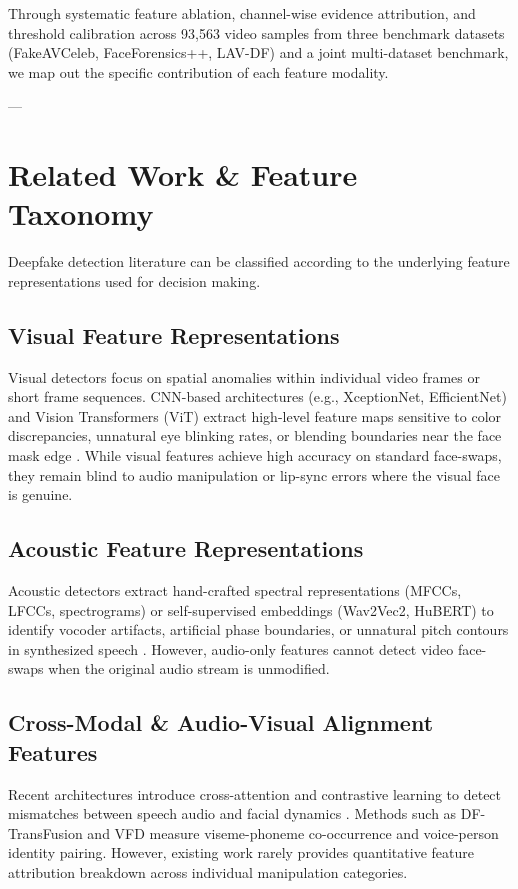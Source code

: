\documentclass[conference]{IEEEtran}
\begin{document}
Through systematic feature ablation, channel-wise evidence attribution, and threshold calibration across 93,563 video samples from three benchmark datasets (FakeAVCeleb, FaceForensics++, LAV-DF) and a joint multi-dataset benchmark, we map out the specific contribution of each feature modality.

---

\section{Related Work \& Feature Taxonomy}

Deepfake detection literature can be classified according to the underlying feature representations used for decision making.

\subsection{Visual Feature Representations}
Visual detectors focus on spatial anomalies within individual video frames or short frame sequences. CNN-based architectures (e.g., XceptionNet, EfficientNet) and Vision Transformers (ViT) extract high-level feature maps sensitive to color discrepancies, unnatural eye blinking rates, or blending boundaries near the face mask edge \cite{rossler2019faceforensics, zhao2024interpretable}. While visual features achieve high accuracy on standard face-swaps, they remain blind to audio manipulation or lip-sync errors where the visual face is genuine.

\subsection{Acoustic Feature Representations}
Acoustic detectors extract hand-crafted spectral representations (MFCCs, LFCCs, spectrograms) or self-supervised embeddings (Wav2Vec2, HuBERT) to identify vocoder artifacts, artificial phase boundaries, or unnatural pitch contours in synthesized speech \cite{shi2026audio, lee2026dynamic}. However, audio-only features cannot detect video face-swaps when the original audio stream is unmodified.

\subsection{Cross-Modal & Audio-Visual Alignment Features}
Recent architectures introduce cross-attention and contrastive learning to detect mismatches between speech audio and facial dynamics \cite{kharel2023dftransfusion, zhou2023joint, zhang2023joint}. Methods such as DF-TransFusion \cite{kharel2023dftransfusion} and VFD \cite{wang2024vfd} measure viseme-phoneme co-occurrence and voice-person identity pairing. However, existing work rarely provides quantitative feature attribution breakdown across individual manipulation categories.
\end{document}
